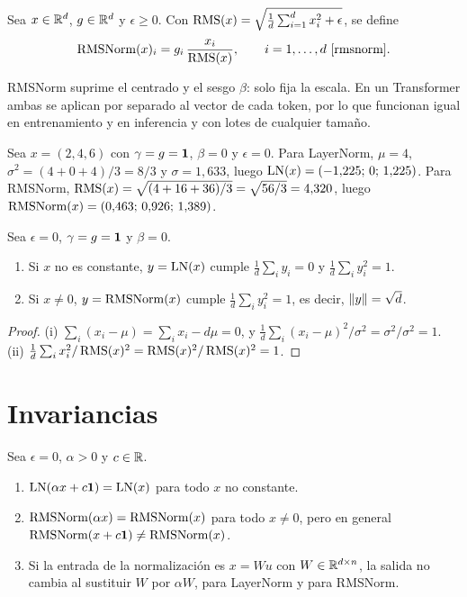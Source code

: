 \begin{definicion}[RMSNorm]\label{def:rmsnorm}
Sea $x\in\mathbb{R}^{d}$, $g\in\mathbb{R}^{d}$ y $\epsilon\ge 0$. Con $\operatorname{RMS}(x)=\sqrt{\frac1d\sum_{i=1}^{d}x_i^{2}+\epsilon}$, se define
\[
\operatorname{RMSNorm}(x)_i=g_i\,\frac{x_i}{\operatorname{RMS}(x)},\qquad i=1,\dots,d~\cite{rmsnorm}.
\]
\end{definicion}

RMSNorm suprime el centrado y el sesgo $\beta$: solo fija la escala. En un Transformer ambas se aplican por separado al vector de cada token, por lo que funcionan igual en entrenamiento y en inferencia y con lotes de cualquier tamaño.

\begin{ejemplo}\label{ej:normas}
Sea $x=(2,4,6)$ con $\gamma=g=\mathbf{1}$, $\beta=0$ y $\epsilon=0$. Para LayerNorm, $\mu=4$, $\sigma^{2}=(4+0+4)/3=8/3$ y $\sigma=1{,}633$, luego $\operatorname{LN}(x)=(-1{,}225;\,0;\,1{,}225)$. Para RMSNorm, $\operatorname{RMS}(x)=\sqrt{(4+16+36)/3}=\sqrt{56/3}=4{,}320$, luego $\operatorname{RMSNorm}(x)=(0{,}463;\,0{,}926;\,1{,}389)$.
\end{ejemplo}

\begin{proposicion}\label{prop:estad-salida}
Sea $\epsilon=0$, $\gamma=g=\mathbf{1}$ y $\beta=0$.
\begin{enumerate}
  \item Si $x$ no es constante, $y=\operatorname{LN}(x)$ cumple $\frac1d\sum_iy_i=0$ y $\frac1d\sum_iy_i^{2}=1$.
  \item Si $x\ne 0$, $y=\operatorname{RMSNorm}(x)$ cumple $\frac1d\sum_iy_i^{2}=1$, es decir, $\lVert y\rVert=\sqrt d$.
\end{enumerate}
\end{proposicion}

\begin{proof}
(i) $\sum_i(x_i-\mu)=\sum_ix_i-d\mu=0$, y $\frac1d\sum_i(x_i-\mu)^{2}/\sigma^{2}=\sigma^{2}/\sigma^{2}=1$. (ii) $\frac1d\sum_ix_i^{2}/\operatorname{RMS}(x)^{2}=\operatorname{RMS}(x)^{2}/\operatorname{RMS}(x)^{2}=1$.
\end{proof}

\section{Invariancias}

\begin{proposicion}[Invariancias]\label{prop:invariancias}
Sea $\epsilon=0$, $\alpha>0$ y $c\in\mathbb{R}$.
\begin{enumerate}
  \item $\operatorname{LN}(\alpha x+c\mathbf{1})=\operatorname{LN}(x)$ para todo $x$ no constante.
  \item $\operatorname{RMSNorm}(\alpha x)=\operatorname{RMSNorm}(x)$ para todo $x\ne 0$, pero en general $\operatorname{RMSNorm}(x+c\mathbf{1})\ne\operatorname{RMSNorm}(x)$.
  \item Si la entrada de la normalización es $x=Wu$ con $W\in\mathbb{R}^{d\times n}$, la salida no cambia al sustituir $W$ por $\alpha W$, para LayerNorm y para RMSNorm.
\end{enumerate}
\end{proposicion}

